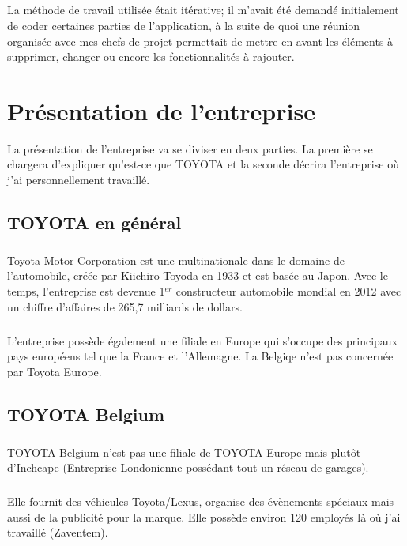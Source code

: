 \documentclass[12pt]{report}
\begin{document}
\paragraph{}
La méthode de travail utilisée était itérative; il m’avait été demandé initialement de coder certaines parties de l’application, à la suite de quoi une réunion organisée avec mes chefs de projet permettait de mettre en avant les éléments à supprimer, changer ou encore les fonctionnalités à rajouter.

\chapter{Présentation de l'entreprise}
La présentation de l'entreprise va se diviser en deux parties. La première se chargera d'expliquer qu'est-ce que TOYOTA et la seconde décrira l'entreprise où j'ai personnellement travaillé.
\section*{TOYOTA en général}

\paragraph{}
Toyota Motor Corporation est une multinationale dans le domaine de l'automobile, créée par Kiichiro Toyoda en 1933 et est basée au Japon.
Avec le temps, l'entreprise est devenue 1$^{er}$ constructeur automobile mondial en 2012 avec un chiffre d’affaires de 265,7 milliards de dollars.

\paragraph{}
L'entreprise possède également une filiale en Europe qui s'occupe des principaux pays européens tel que la France et l'Allemagne. La Belgiqe n'est pas concernée par Toyota Europe. 

\section*{TOYOTA Belgium}
\paragraph{}
TOYOTA Belgium n'est pas une filiale de TOYOTA Europe mais plutôt d'Inchcape (Entreprise Londonienne possédant tout un réseau de garages).

\paragraph{}
Elle fournit des véhicules Toyota/Lexus, organise des évènements spéciaux mais aussi de la publicité pour la marque. Elle possède environ 120 employés là où j'ai travaillé (Zaventem). 
\end{document}
